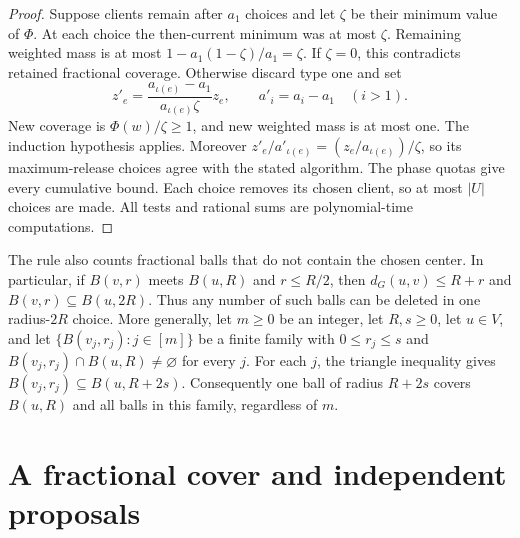\documentclass[11pt]{article}
\numberwithin{equation}{section}
\theoremstyle{definition}
\begin{document}
\begin{proof}
Suppose clients remain after $a_1$ choices and let $\zeta$ be their
minimum value of $\Phi$. At each choice the then-current minimum was
at most $\zeta$. Remaining weighted mass is at most
$1-a_1(1-\zeta)/a_1=\zeta$. If $\zeta=0$, this contradicts retained
fractional coverage. Otherwise discard type one and set
\[
 z'_e=\frac{a_{\iota(e)}-a_1}{a_{\iota(e)}\zeta}z_e,
 \qquad a'_i=a_i-a_1\quad(i>1).
\]
New coverage is $\Phi(w)/\zeta\ge1$, and new weighted mass is at most
one. The induction hypothesis applies. Moreover
$z'_e/a'_{\iota(e)}=(z_e/a_{\iota(e)})/\zeta$, so its
maximum-release choices agree with the stated algorithm. The phase
quotas give every cumulative bound.
Each choice removes its chosen client, so at most $|U|$ choices are
made. All tests and rational sums are polynomial-time computations.
\end{proof}

The rule also counts fractional balls that do not contain the chosen
center. In particular, if $B(v,r)$ meets $B(u,R)$ and $r\le R/2$, then
$d_G(u,v)\le R+r$ and $B(v,r)\subseteq B(u,2R)$.
Thus any number of such balls can be deleted in one radius-$2R$ choice.
More generally, let $m\ge0$ be an integer, let $R,s\ge0$, let $u\in V$, and let
$\{B(v_j,r_j):j\in[m]\}$ be a finite family with $0\le r_j\le s$
and $B(v_j,r_j)\cap B(u,R)\ne\varnothing$ for every $j$.
For each $j$, the triangle inequality gives
$B(v_j,r_j)\subseteq B(u,R+2s)$.
Consequently one ball of radius $R+2s$ covers $B(u,R)$ and all balls
in this family, regardless of $m$.

\section{A fractional cover and independent proposals}\label{sec:proposals}
\end{document}
